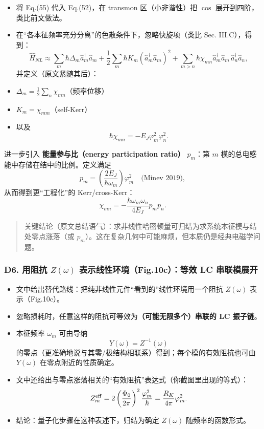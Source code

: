 \documentclass[12pt,a4paper,oneside]{ctexbook}
\providecommand{\tightlist}{%
  \setlength{\itemsep}{0pt}\setlength{\parskip}{0pt}}
\begin{document}
\begin{itemize}
\tightlist
\item
  将 Eq.(55) 代入 Eq.(52)，在 transmon 区（小非谐性）把 \(\cos\)
  展开到四阶，类比前文做法。
\item
  在``各本征频率充分分离''的色散条件下，忽略快旋项（类比 Sec.
  III.C），得到： \[
  \hat H_{NL}\approx
  \sum_m \hbar\Delta_m \hat a_m^\dagger\hat a_m
  +\frac12\sum_m \hbar K_m(\hat a_m^\dagger\hat a_m)^2
  +\sum_{m>n}\hbar\chi_{mn}\hat a_m^\dagger\hat a_m\,\hat a_n^\dagger\hat a_n,
  \tag{56}
  \] 并定义（原文紧随其后）：
\item
  \(\Delta_m=\frac12\sum_n \chi_{mn}\)（频率位移）
\item
  \(K_m=\chi_{mm}\)（self-Kerr）
\item
  以及 \[
  \hbar\chi_{mn}=-E_J\varphi_m^2\varphi_n^2.
  \tag{57}
  \]
\end{itemize}

进一步引入 \textbf{能量参与比（energy participation ratio）} \(p_m\)：第
\(m\) 模的总电感能中存储在结中的比例。定义满足 \[
p_m=\left(\frac{2E_J}{\hbar\omega_m}\right)\varphi_m^2 \quad \text{(Minev 2019)},
\] 从而得到更``工程化''的 Kerr/cross-Kerr： \[
\chi_{mn}=-\frac{\hbar\omega_m\omega_n}{4E_J}p_m p_n.
\tag{58}
\]

\begin{quote}
关键结论（原文总结语气）：求非线性哈密顿量可归结为求系统本征模与结处零点涨落（或
\(p_m\)）。这在复杂几何中可能麻烦，但本质仍是经典电磁学问题。
\end{quote}

\subsubsection{\texorpdfstring{\textbf{D6. 用阻抗 \(Z(\omega)\)
表示线性环境（Fig.10c）：等效 LC
串联模展开}}{D6. 用阻抗 Z(\textbackslash{}omega) 表示线性环境（Fig.10c）：等效 LC 串联模展开}}\label{d6.-ux7528ux963bux6297-zomega-ux8868ux793aux7ebfux6027ux73afux5883fig.10cux7b49ux6548-lc-ux4e32ux8054ux6a21ux5c55ux5f00}

\begin{itemize}
\tightlist
\item
  文中给出替代路线：把纯非线性元件``看到的''线性环境用一个阻抗
  \(Z(\omega)\) 表示（Fig.10c）。
\item
  忽略损耗时，任意这样的阻抗可等效为\textbf{（可能无限多个）串联的 LC
  振子链}。
\item
  本征频率 \(\omega_m\) 可由导纳 \[
  Y(\omega)=Z^{-1}(\omega)
  \] 的零点（更准确地说与其零/极结构相联系）得到；每个模的有效阻抗也可由
  \(Y(\omega)\) 在零点附近的性质确定。
\item
  文中还给出与零点涨落相关的``有效阻抗''表达式（你截图里出现的等式）：
  \[
  Z_m^{\rm eff}=2\left(\frac{\Phi_0}{2\pi}\right)^2\frac{\varphi_m^2}{\hbar}
  =\frac{R_K}{4\pi}\varphi_m^2.
  \]
\item
  结论：量子化步骤在这种表述下，归结为确定 \(Z(\omega)\)
  随频率的函数形式。
\end{itemize}
\end{document}
